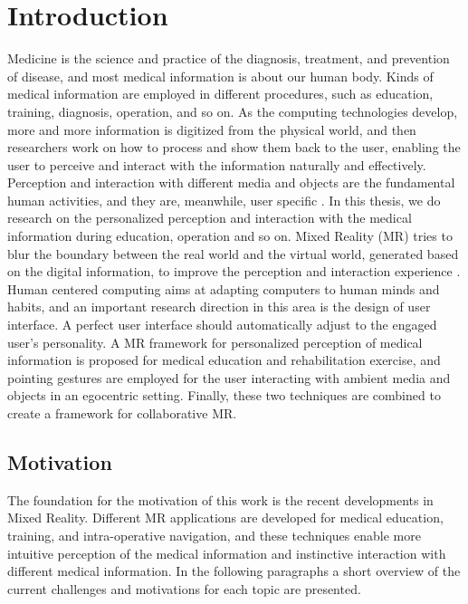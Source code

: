 %
\chapter{Introduction}  %
\label{sec:introduction}
Medicine is the science and practice of the diagnosis, treatment, and prevention of disease, and most medical information is about our human body. Kinds of medical information are employed in different procedures, such as education, training, diagnosis, operation, and so on. 
As the computing technologies develop, more and more information is digitized from the physical world, and then researchers work on how to process and show them back to the user, enabling the user to perceive and interact with the information naturally and effectively. 
Perception and interaction with different media and objects are the fundamental human activities, and they are, meanwhile, user specific \cite{Turk2000}.
In this thesis, we do research on the personalized perception and interaction with the medical information during education, operation and so on. 
Mixed Reality (MR) tries to blur the boundary between the real world and the virtual world, generated based on the digital information, to improve the perception and interaction experience \cite{Kruijff2010}.
Human centered computing aims at adapting computers to human minds and habits, and an important research direction in this area is the design of user interface. 
A perfect user interface should automatically adjust to the engaged user's personality. 
A MR framework for personalized perception of medical information is proposed for medical education and rehabilitation exercise, and pointing gestures are employed for the user interacting with ambient media and objects in an egocentric setting. Finally, these two techniques are combined to create a framework for collaborative MR.

\section{Motivation}
The foundation for the motivation of this work is the recent developments in Mixed Reality. Different MR applications are developed for medical education, training, and intra-operative navigation, and these techniques enable more intuitive perception of the medical information and instinctive interaction with different medical information. 
In the following paragraphs a short overview of the current challenges and motivations for each topic are presented. 

